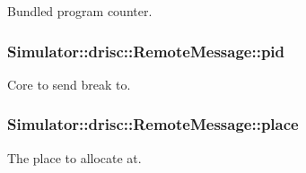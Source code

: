Bundled program counter. 

\hypertarget{struct_simulator_1_1drisc_1_1_remote_message_a4d83820ebc69ab411553e33cdf06546c}{
\subsubsection[{pid}]{ Simulator\+::drisc\+::\+Remote\+Message\+::pid}}\label{struct_simulator_1_1drisc_1_1_remote_message_a4d83820ebc69ab411553e33cdf06546c}


Core to send break to. 

\hypertarget{struct_simulator_1_1drisc_1_1_remote_message_a20a7c7b765b7ef4cea77a5c9c0053c80}{
\subsubsection[{place}]{ Simulator\+::drisc\+::\+Remote\+Message\+::place}}\label{struct_simulator_1_1drisc_1_1_remote_message_a20a7c7b765b7ef4cea77a5c9c0053c80}


The place to allocate at. 

